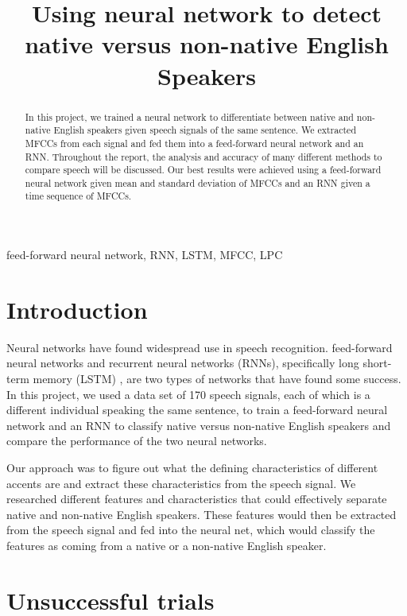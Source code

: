 \documentclass{article}
\title{Using neural network to detect native versus non-native English Speakers}
\begin{document}

\maketitle

\begin{abstract}
	In this project, we trained a neural network to differentiate between native and non-native English speakers given speech signals of the same sentence.
	We extracted MFCCs from each signal and fed them into a feed-forward neural network and an RNN.
	Throughout the report, the analysis and accuracy of many different methods to compare speech will be discussed. 
	Our best results were achieved using a feed-forward neural network given mean and standard deviation of MFCCs and an RNN given a time sequence of MFCCs.
\end{abstract}

\begin{keywords}
feed-forward neural network,
RNN,
LSTM,
MFCC,
LPC
\end{keywords}

\section{Introduction}
\label{sec:intro}

Neural networks have found widespread use in speech recognition.
feed-forward neural networks \cite{microsoft} and recurrent neural networks (RNNs), specifically long short-term memory (LSTM) \cite{google}, are two types of networks that have found some success. 
In this project, we used a data set of 170 speech signals, each of which is a different individual speaking the same sentence, to train a feed-forward neural network and an RNN to classify native versus non-native English speakers and compare the performance of the two neural networks. 

Our approach was to figure out what the defining characteristics of different accents are and extract these characteristics from the speech signal.
We researched different features and characteristics that could effectively separate native and non-native English speakers.
These features would then be extracted from the speech signal and fed into the neural net, which would classify the features as coming from a native or a non-native English speaker.

\section{Unsuccessful trials}
\label{sec:unsuccessful}
\end{document}
